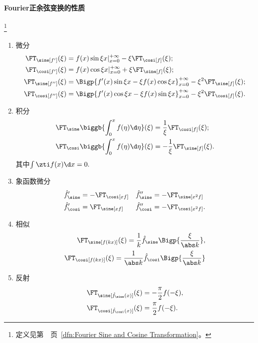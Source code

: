 \paragraph{Fourier正余弦变换的性质}\label{The Property of Sine and Cosine Transformation}\footnote{定义见第~\pageref{dfn:Fourier Sine and Cosine Transformation}~页~\ref{dfn:Fourier Sine and Cosine Transformation}。}
\begin{enumerate}
	\item 微分
	\begin{align*}
		\FT_\sine[f'](\xi)&=f(x)\sin\xi x|_{x=0}^{+\infty}-\xi\FT_\cosi[f](\xi);\\
		\FT_\cosi[f'](\xi)&=f(x)\cos\xi x|_{x=0}^{+\infty}+\xi\FT_\sine[f](\xi);\\
		\FT_\sine[f''](\xi)&=\Bigp{f'(x)\sin\xi x-\xi f(x)\cos\xi x}_{x=0}^{+\infty}-\xi^2\FT_\sine[f](\xi);\\
		\FT_\cosi[f''](\xi)&=\Bigp{f'(x)\cos\xi x-\xi f(x)\sin\xi x}_{x=0}^{+\infty}-\xi^2\FT_\cosi[f](\xi).
	\end{align*}
	\item 积分
	\begin{align*}
		\FT_\sine\biggb{\int_0^xf(\eta)\d\eta}(\xi)&=\frac1\xi\FT_\cosi[f](\xi);\\
		\FT_\cosi\biggb{\int_0^xf(\eta)\d\eta}(\xi)&=-\frac1\xi\FT_\sine[f](\xi).
	\end{align*}
	其中$\int\zti f(x)\d x=0.$
	\item 象函数微分
	\begin{align*}
		\hat f_\sine'&=-\FT_\cosi[xf]&\hat f_\sine''&=-\FT_\sine[x^2f]\\
		\hat f_\cosi'&=\FT_\sine[xf]&\hat f_\cosi''&=-\FT_\cosi[x^2f].
	\end{align*}
	\item 相似\begin{align*}
		\FT_\sine[f(kx)](\xi)=\frac1k\hat f_\sine\Bigp{\frac\xi{\abs k}},\\
		\FT_\cosi[f(kx)](\xi)=\frac1{\abs k}\hat f_\cosi\Bigp{\frac\xi{\abs k}}
	\end{align*}
	\item 反射\begin{align*}
		\FT_\sine[\hat f_\sine(x)](\xi)&=-\frac\pi{2}f(-\xi),\\
		\FT_\cosi[\hat f_\cosi(x)](\xi)&=\frac\pi{2}f(-\xi).
	\end{align*}
\end{enumerate}
